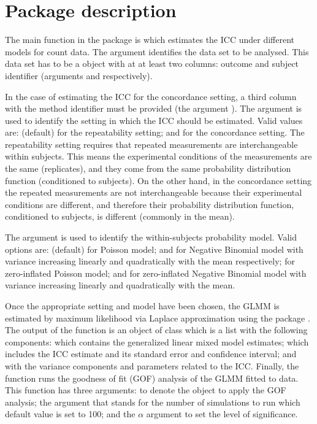 \hypertarget{package-description}{%
\section{Package description}\label{package-description}}

The main function in the  package is
 which estimates the ICC under different models for
count data. The argument  identifies the data set to be
analysed. This data set has to be a  object with at at
least two columns: outcome and subject identifier (arguments  and
 respectively).

In the case of estimating the ICC for the concordance setting, a third
column with the method identifier must be provided (the argument
). The argument  is used to identify the setting in
which the ICC should be estimated. Valid values are:  (default)
for the repeatability setting; and  for the concordance
setting. The repeatability setting requires that repeated measurements
are interchangeable within subjects. This means the experimental
conditions of the measurements are the same (replicates), and they come
from the same probability distribution function (conditioned to
subjects). On the other hand, in the concordance setting the repeated
measurements are not interchangeable because their experimental
conditions are different, and therefore their probability distribution
function, conditioned to subjects, is different (commonly in the mean).

The argument  is used to identify the within-subjects
probability model. Valid options are:  (default) for
Poisson model;  and  for Negative Binomial
model with variance increasing linearly and quadratically with the mean
respectively;  for zero-inflated Poisson model;  and
 for zero-inflated Negative Binomial model with variance
increasing linearly and quadratically with the mean.

Once the appropriate setting and model have been chosen, the GLMM is
estimated by maximum likelihood via Laplace approximation using the
 package \citep{brooks2017}. The output of the
 function is an object of class  which is a
list with the following components:  which contains the
generalized linear mixed model estimates;  which includes the
ICC estimate and its standard error and confidence interval; and
 with the variance components and parameters related to the
ICC. Finally, the function  runs the goodness of fit
(GOF) analysis of the GLMM fitted to data. This function has three
arguments:  to denote the  object to apply the GOF
analysis; the  argument that stands for the number of
simulations to run which default value is set to 100; and the \(\alpha\)
argument to set the level of significance.

